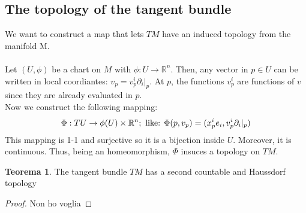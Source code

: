 \documentclass[12pt,a4paper]{report}
\theoremstyle{definition}
\theoremstyle{Theorem}
\newtheorem{Theo}[Def]{Teorema}
\theoremstyle{definition}
\theoremstyle{definition}
\theoremstyle{definition}
\begin{document}
		\subsection{The topology of the tangent bundle}
		We want to construct a map that lets $TM$ have an induced topology from the manifold M.\\
		\\
		Let $(U,\phi)$ be a chart on $M$ with $\phi:U\rightarrow \mathbb{R}^n$. Then, any vector in $p\in U$ can be written in local coordiantes: $v_p=v^i_p\partial_i|_p$. At $p$, the functions $v^i_p$ are functions of $v$ since they are already evaluated in $p$.\\
		Now we construct the following mapping:
		$$\Phi:TU\rightarrow \phi(U)\times \mathbb{R}^n; \hbox{ like: }
		\Phi(p,v_p)=(x^i_pe_i,v^i_p\partial_i|_p)$$
		This mapping is 1-1 and surjective so it is a bijection inside $U$. Moreover, it is continuous. Thus, being an homeomorphism, $\Phi$ insuces a topology on $TM$.
		\begin{Theo} \label{Theo_5.1}
			The tangent bundle $TM$ has a second countable and Haussdorf topology
		\end{Theo}
		\begin{proof}
			Non ho voglia
		\end{proof}
\end{document}
